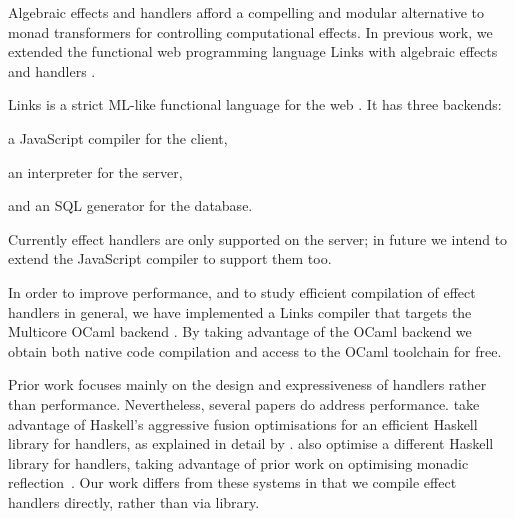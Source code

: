 \documentclass[preprint,numbers]{sigplanconf}
\newcommand{\msgbox}[2]{{%
  \par\noindent\small\color{red}%
  \framebox{\parbox{\dimexpr\linewidth-2\fboxsep-2\fboxrule}{\textbf{#1:} #2}}%
}}
\newcommand{\kc}[1]{\msgbox{KC}{#1}}
\begin{document}
Algebraic effects and handlers \cite{Plotkin2013} afford a compelling
and modular alternative to monad transformers for controlling
computational effects. In previous work, we extended the functional
web programming language Links with algebraic effects and handlers
\cite{Hillerstrom2015,Hillerstrom2016}.

Links is a strict ML-like functional language for the web
\cite{Cooper2006}. It has three backends:
\begin{enumerate*}[label={\roman*)}]
 \item a JavaScript compiler for the client,
 \item an interpreter for the server,
 \item and an SQL generator for the database.
\end{enumerate*}
Currently effect handlers are only supported on the server; in future
we intend to extend the JavaScript compiler to support them too.

In order to improve performance, and to study efficient compilation of
effect handlers in general, we have implemented a Links compiler that
targets the Multicore OCaml backend \cite{Dolan2015}. By taking
advantage of the OCaml backend we obtain both native code compilation
and access to the OCaml toolchain for free.


Prior work focuses mainly on the design and expressiveness of handlers
rather than performance. Nevertheless, several papers do address
performance. \citet{Kammar2013} take advantage of Haskell's aggressive
fusion optimisations for an efficient Haskell library for handlers, as
explained in detail by \citet{Wu2015}. \citet{Kiselyov2015} also
optimise a different Haskell library for handlers, taking advantage of
prior work on optimising monadic reflection~\citep{PloegK14}.  Our
work differs from these systems in that we compile effect handlers
directly, rather than via library.


\end{document}

